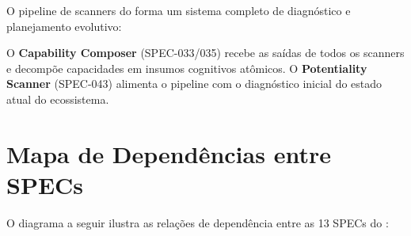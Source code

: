 O pipeline de scanners do \opencodeeco{} forma um sistema completo de
diagnóstico e planejamento evolutivo:

\begin{table}[htb]
\centering
\caption{Os 6 scanners do pipeline epistemológico}
\label{tab:cheatsheet-scanners}
\small
\end{table}

\noindent O \textbf{Capability Composer} (SPEC-033/035) recebe as saídas de
todos os scanners e decompõe capacidades em insumos cognitivos atômicos.
O \textbf{Potentiality Scanner} (SPEC-043) alimenta o pipeline com o
diagnóstico inicial do estado atual do ecossistema.

\section*{Mapa de Dependências entre SPECs}

O diagrama a seguir ilustra as relações de dependência entre as 13 SPECs
do \opencodeeco{}:

